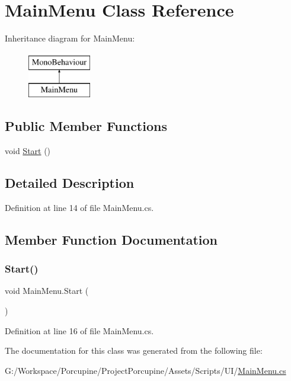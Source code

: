\hypertarget{class_main_menu}{}\section{Main\+Menu Class Reference}
\label{class_main_menu}
Inheritance diagram for Main\+Menu\+:\begin{figure}[H]
\begin{center}
\leavevmode
\includegraphics[height=2.000000cm]{class_main_menu}
\end{center}
\end{figure}
\subsection*{Public Member Functions}
\begin{DoxyCompactItemize}
\item 
void \hyperlink{class_main_menu_ad629921d8cbec1c1bf97e6bc6ad65902}{Start} ()
\end{DoxyCompactItemize}


\subsection{Detailed Description}


Definition at line 14 of file Main\+Menu.\+cs.



\subsection{Member Function Documentation}
\mbox{\label{class_main_menu_ad629921d8cbec1c1bf97e6bc6ad65902}} 
\subsubsection{\texorpdfstring{Start()}{Start()}}
{\footnotesize\ttfamily void Main\+Menu.\+Start (\begin{DoxyParamCaption}{ }\end{DoxyParamCaption})}



Definition at line 16 of file Main\+Menu.\+cs.



The documentation for this class was generated from the following file\+:\begin{DoxyCompactItemize}
\item 
G\+:/\+Workspace/\+Porcupine/\+Project\+Porcupine/\+Assets/\+Scripts/\+U\+I/\hyperlink{_main_menu_8cs}{Main\+Menu.\+cs}\end{DoxyCompactItemize}
